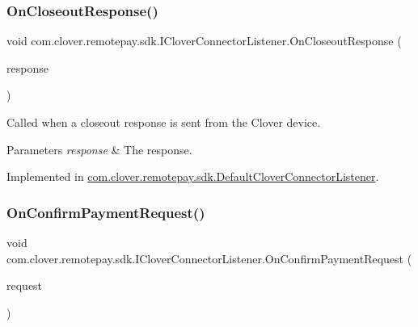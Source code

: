 \subsubsection{\texorpdfstring{On\+Closeout\+Response()}{OnCloseoutResponse()}}
{\footnotesize\ttfamily void com.\+clover.\+remotepay.\+sdk.\+I\+Clover\+Connector\+Listener.\+On\+Closeout\+Response (\begin{DoxyParamCaption}\item[{\hyperlink{classcom_1_1clover_1_1remotepay_1_1sdk_1_1_closeout_response}{Closeout\+Response}}]{response }\end{DoxyParamCaption})}



Called when a closeout response is sent from the Clover device. 


\begin{DoxyParams}{Parameters}
{\em response} & The response.\\
\hline
\end{DoxyParams}


Implemented in \hyperlink{classcom_1_1clover_1_1remotepay_1_1sdk_1_1_default_clover_connector_listener_ae5a9a85a4807b9823869577a1d58d953}{com.\+clover.\+remotepay.\+sdk.\+Default\+Clover\+Connector\+Listener}.

\mbox{\label{interfacecom_1_1clover_1_1remotepay_1_1sdk_1_1_i_clover_connector_listener_a2295110c07af954e141ee82acde10e8a}} 
\subsubsection{\texorpdfstring{On\+Confirm\+Payment\+Request()}{OnConfirmPaymentRequest()}}
{\footnotesize\ttfamily void com.\+clover.\+remotepay.\+sdk.\+I\+Clover\+Connector\+Listener.\+On\+Confirm\+Payment\+Request (\begin{DoxyParamCaption}\item[{\hyperlink{classcom_1_1clover_1_1remotepay_1_1sdk_1_1_confirm_payment_request}{Confirm\+Payment\+Request}}]{request }\end{DoxyParamCaption})}



